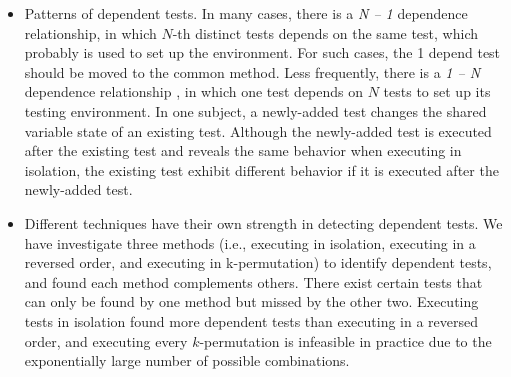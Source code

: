 

\begin{itemize}

\item {} Patterns of dependent tests.
In many cases, there is a \textit{N -- 1} 
dependence relationship, in which $N$-th  distinct tests depends on the same test, which probably is used to set up the environment. For
such cases, the 1 depend test  should be moved to the common 
 method.
Less frequently, there is a \textit{1 -- N} dependence relationship
, in which one
test depends on $N$ tests to set up its testing environment.  In one subject, a newly-added test changes the shared variable state of an existing test. Although the newly-added test is executed after the existing test and reveals the same behavior when executing in isolation, the existing test exhibit different behavior if it is executed after the newly-added test.


\item 
{}
Different techniques have their own strength in detecting dependent tests. We
have investigate three methods (i.e., executing in isolation, executing in a
reversed order, and executing in
k-permutation) to identify dependent tests, and found each method complements others. There exist certain tests that can only be found by one method
but missed by the other two.  Executing tests in isolation found more dependent tests
than executing in a reversed order, and executing every $k$-permutation is
infeasible in practice due to the exponentially large number of possible combinations.

\end{itemize}
